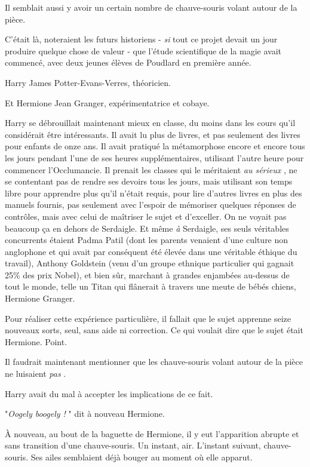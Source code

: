 Il semblait aussi y avoir un certain nombre de chauve-souris volant autour de la pièce.

C'était là, noteraient les futurs historiens - \emph{si}  tout ce projet devait un jour produire quelque chose de valeur - que l'étude scientifique de la magie avait commencé, avec deux jeunes élèves de Poudlard en première année.

Harry James Potter-Evans-Verres, théoricien.

Et Hermione Jean Granger, expérimentatrice et cobaye.

Harry se débrouillait maintenant mieux en classe, du moins dans les cours qu'il considérait être intéressants. Il avait lu plus de livres, et pas seulement des livres pour enfants de onze ans. Il avait pratiqué la métamorphose encore et encore tous les jours pendant l'une de ses heures supplémentaires, utilisant l'autre heure pour commencer l'Occlumancie. Il prenait les classes qui le méritaient \emph{au sérieux} , ne se contentant pas de rendre ses devoirs tous les jours, mais utilisant son temps libre pour apprendre plus qu'il n'était requis, pour lire d'autres livres en plus des manuels fournis, pas seulement avec l'espoir de mémoriser quelques réponses de contrôles, mais avec celui de maîtriser le sujet et d'exceller. On ne voyait pas beaucoup ça en dehors de Serdaigle. Et même \emph{à}  Serdaigle, ses seuls véritables concurrents étaient Padma Patil (dont les parents venaient d'une culture non anglophone et qui avait par conséquent été élevée dans une véritable éthique du travail), Anthony Goldstein (venu d'un groupe ethnique particulier qui gagnait 25\% des prix Nobel), et bien sûr, marchant à grandes enjambées au-dessus de tout le monde, telle un Titan qui flânerait à travers une meute de bébés chiens, Hermione Granger.

Pour réaliser cette expérience particulière, il fallait que le sujet apprenne seize nouveaux sorts, seul, sans aide ni correction. Ce qui voulait dire que le sujet était Hermione. Point.

Il faudrait maintenant mentionner que les chauve-souris volant autour de la pièce ne luisaient \emph{pas} .

Harry avait du mal à accepter les implications de ce fait.

"\emph{Oogely boogely !} " dit à nouveau Hermione.

À nouveau, au bout de la baguette de Hermione, il y eut l'apparition abrupte et sans transition d'une chauve-souris. Un instant, air. L'instant suivant, chauve-souris. Ses ailes semblaient déjà bouger au moment où elle apparut.

